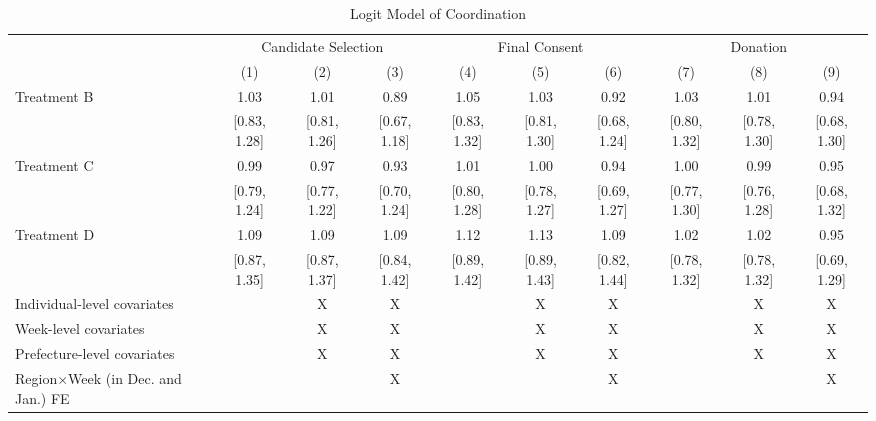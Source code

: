 \documentclass[12pt, a4paper]{article}
\begin{document}
\begin{landscape}\begin{table}[H]

\caption{\label{tab:coordinate-logit}Logit Model of Coordination}
\centering
\fontsize{8}{10}\selectfont
\begin{threeparttable}
\begin{tabular}[t]{lccccccccc}
\toprule
\multicolumn{1}{c}{ } & \multicolumn{3}{c}{Candidate Selection} & \multicolumn{3}{c}{Final Consent} & \multicolumn{3}{c}{Donation} \\
\cmidrule(l{3pt}r{3pt}){2-4} \cmidrule(l{3pt}r{3pt}){5-7} \cmidrule(l{3pt}r{3pt}){8-10}
  & (1) & (2) & (3) & (4) & (5) & (6) & (7) & (8) & (9)\\
\midrule
Treatment B & \num{1.03} & \num{1.01} & \num{0.89} & \num{1.05} & \num{1.03} & \num{0.92} & \num{1.03} & \num{1.01} & \num{0.94}\\
 & {}[\num{0.83}, \num{1.28}] & {}[\num{0.81}, \num{1.26}] & {}[\num{0.67}, \num{1.18}] & {}[\num{0.83}, \num{1.32}] & {}[\num{0.81}, \num{1.30}] & {}[\num{0.68}, \num{1.24}] & {}[\num{0.80}, \num{1.32}] & {}[\num{0.78}, \num{1.30}] & {}[\num{0.68}, \num{1.30}]\\
Treatment C & \num{0.99} & \num{0.97} & \num{0.93} & \num{1.01} & \num{1.00} & \num{0.94} & \num{1.00} & \num{0.99} & \num{0.95}\\
 & {}[\num{0.79}, \num{1.24}] & {}[\num{0.77}, \num{1.22}] & {}[\num{0.70}, \num{1.24}] & {}[\num{0.80}, \num{1.28}] & {}[\num{0.78}, \num{1.27}] & {}[\num{0.69}, \num{1.27}] & {}[\num{0.77}, \num{1.30}] & {}[\num{0.76}, \num{1.28}] & {}[\num{0.68}, \num{1.32}]\\
Treatment D & \num{1.09} & \num{1.09} & \num{1.09} & \num{1.12} & \num{1.13} & \num{1.09} & \num{1.02} & \num{1.02} & \num{0.95}\\
 & {}[\num{0.87}, \num{1.35}] & {}[\num{0.87}, \num{1.37}] & {}[\num{0.84}, \num{1.42}] & {}[\num{0.89}, \num{1.42}] & {}[\num{0.89}, \num{1.43}] & {}[\num{0.82}, \num{1.44}] & {}[\num{0.78}, \num{1.32}] & {}[\num{0.78}, \num{1.32}] & {}[\num{0.69}, \num{1.29}]\\
\midrule
Individual-level covariates &  & X & X &  & X & X &  & X & X\\
Week-level covariates &  & X & X &  & X & X &  & X & X\\
Prefecture-level covariates &  & X & X &  & X & X &  & X & X\\
Region$\times$Week (in Dec. and Jan.) FE &  &  & X &  &  & X &  &  & X\\

\end{tabular}
\end{threeparttable}
\end{table}
\end{landscape}
\end{document}
